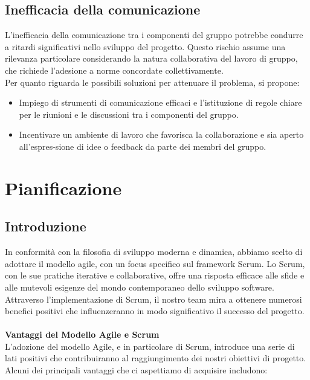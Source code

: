 \documentclass{article}
\begin{document}
\subsection{Inefficacia della comunicazione} 
L’inefficacia della comunicazione tra i componenti del gruppo potrebbe condurre a ritardi significativi nello sviluppo del progetto. Questo rischio assume una rilevanza particolare considerando la natura collaborativa del lavoro di gruppo, che richiede l’adesione a norme concordate collettivamente.
\\Per quanto riguarda le possibili soluzioni per attenuare il problema, si propone:
   \begin{itemize} 
    \item Impiego di strumenti di comunicazione efficaci e l’istituzione di regole chiare per le riunioni e le discussioni tra i componenti del gruppo.
    \item Incentivare un ambiente di lavoro che favorisca la collaborazione e sia aperto all'espres-sione di idee o feedback da parte dei membri del gruppo.
\end{itemize}


\section{Pianificazione}
\subsection{Introduzione}
In conformità con la filosofia di sviluppo moderna e dinamica, abbiamo scelto di adottare il modello agile, con un focus specifico sul framework Scrum.
Lo Scrum, con le sue pratiche iterative e collaborative, offre una risposta efficace alle sfide e alle mutevoli esigenze del mondo contemporaneo dello sviluppo software.\\
Attraverso l'implementazione di Scrum, il nostro team mira a ottenere numerosi benefici positivi che influenzeranno in modo significativo il successo del progetto.
\\
\\
\textbf{Vantaggi del Modello Agile e Scrum}
\\L'adozione del modello Agile, e in particolare di Scrum, introduce una serie di lati positivi che contribuiranno al raggiungimento dei nostri obiettivi di progetto.
Alcuni dei principali vantaggi che ci aspettiamo di acquisire includono:
\end{document}
